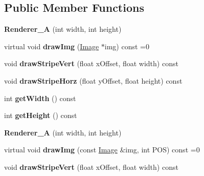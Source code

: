 \subsection*{Public Member Functions}
\begin{DoxyCompactItemize}
\item 
\hypertarget{class_renderer___a_afaef918b4d9abdb929d9a437d00e3eb8}{{\bfseries Renderer\-\_\-\-A} (int width, int height)}\label{class_renderer___a_afaef918b4d9abdb929d9a437d00e3eb8}

\item 
\hypertarget{class_renderer___a_ae17c1f0f1858f8088dc04a4b04482d4e}{virtual void {\bfseries draw\-Img} (\hyperlink{class_image}{Image} $\ast$img) const =0}\label{class_renderer___a_ae17c1f0f1858f8088dc04a4b04482d4e}

\item 
\hypertarget{class_renderer___a_af817037b1ebd9906e5f4faee1637bdf0}{void {\bfseries draw\-Stripe\-Vert} (float x\-Offset, float width) const }\label{class_renderer___a_af817037b1ebd9906e5f4faee1637bdf0}

\item 
\hypertarget{class_renderer___a_a70ea4a1396787e8a3c59c848a6aeabcd}{void {\bfseries draw\-Stripe\-Horz} (float y\-Offset, float height) const }\label{class_renderer___a_a70ea4a1396787e8a3c59c848a6aeabcd}

\item 
\hypertarget{class_renderer___a_a79fb640a6c4a733647f3bc5cd96c3bad}{int {\bfseries get\-Width} () const }\label{class_renderer___a_a79fb640a6c4a733647f3bc5cd96c3bad}

\item 
\hypertarget{class_renderer___a_a69aeb74354637f5d9d7a5508f00dde33}{int {\bfseries get\-Height} () const }\label{class_renderer___a_a69aeb74354637f5d9d7a5508f00dde33}

\item 
\hypertarget{class_renderer___a_afaef918b4d9abdb929d9a437d00e3eb8}{{\bfseries Renderer\-\_\-\-A} (int width, int height)}\label{class_renderer___a_afaef918b4d9abdb929d9a437d00e3eb8}

\item 
\hypertarget{class_renderer___a_a9702e174f4c76edd6059e3593ce03291}{virtual void {\bfseries draw\-Img} (const \hyperlink{class_image}{Image} \&img, int P\-O\-S) const =0}\label{class_renderer___a_a9702e174f4c76edd6059e3593ce03291}

\item 
\hypertarget{class_renderer___a_af817037b1ebd9906e5f4faee1637bdf0}{void {\bfseries draw\-Stripe\-Vert} (float x\-Offset, float width) const }\label{class_renderer___a_af817037b1ebd9906e5f4faee1637bdf0}


\end{DoxyCompactItemize}
